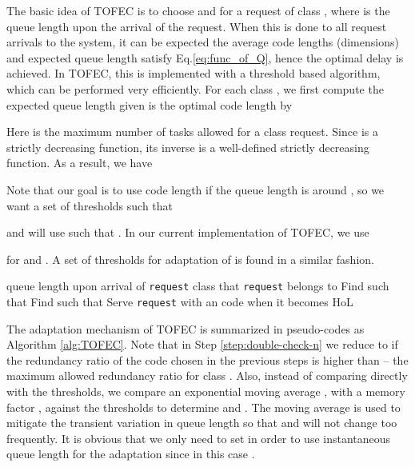 \documentclass[journal]{IEEEtran}
\newcommand{\ourproposal}{TOFEC\xspace}
\begin{document}
The basic idea of \ourproposal is to choose  and  for a request of class , where  is the queue length upon the arrival of the request. When this is done to all request arrivals to the system, it can be expected the average code lengths (dimensions) and expected queue length  satisfy Eq.\ref{eq:func_of_Q}, hence the optimal delay is achieved.  In \ourproposal, this is implemented with a threshold based algorithm, which can be performed very efficiently. 
For each class , we first compute the expected queue length given  is the optimal code length by

Here  is the maximum number of tasks allowed for a class  request. Since  is a strictly decreasing function, its inverse  is a well-defined strictly decreasing function. As a result, we have

Note that our goal is to use code length  if the queue length  is around , so we want a set of thresholds  such that

and will use  such that .
In our current implementation of \ourproposal, we use

for   and .
A set of thresholds  for adaptation of  is found in a similar fashion.






\begin{algorithm}[t]
	 queue length upon arrival of {\tt request}\;
	 class that {\tt request} belongs to\;
	\;
	Find  such that \;
	Find  such that \;
	\;	\label{step:double-check-n}
	Serve {\tt request} with an  code when it becomes HoL\;
	\caption{\ourproposal (Throughput Optimal FEC Cloud)}
	\label{alg:TOFEC}
\end{algorithm}

The adaptation mechanism of \ourproposal is summarized in pseudo-codes as Algorithm \ref{alg:TOFEC}.
Note that in Step \ref{step:double-check-n} we reduce  to  if the redundancy ratio of the code chosen in the previous steps is higher than  -- the maximum allowed redundancy ratio for class . 
Also, instead of comparing  directly with the thresholds, we compare an exponential moving average 
,
with a memory factor , against the thresholds to determine  and . The moving average is used to mitigate the transient variation in queue length so that  and  will not change too frequently. It is obvious that we only need to set  in order to use instantaneous queue length  for the adaptation since in this case .
\end{document}
